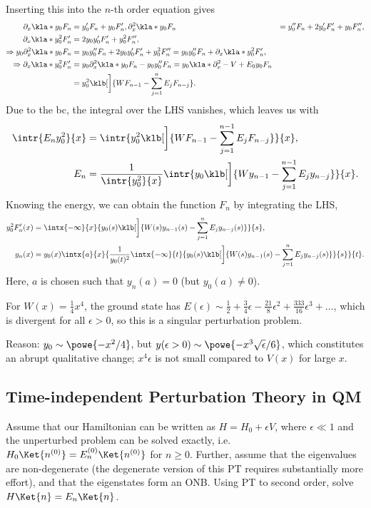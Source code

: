 \documentclass[english, parskip=full]{scrbook}
\newcommand{\note}[1]{\begin{tcolorbox}[colback=colorbackgroundnote,colframe=colornote, breakable,enhanced]#1\end{tcolorbox}}
\newcommand{\example}[3]{\begin{tcolorbox}[colback=colorbackgroundexample,colframe=colorexample, breakable,enhanced,title={\textbf{#1}: #2.}]#3\end{tcolorbox}}
\begin{document}
\example{Method of Reduction}{$y_n(x) = y_0(x)F_n(x)$ with $F_0(x)=1$}{Inserting this into the $n$-th order equation gives
\begin{align}
\partial_x \kla*{y_0F_n} &= y_0'F_n + y_0F_n',
\partial_x^2 \kla*{y_0F_n} &= y_0'' F_n + 2y_0'F_n' + y_0F_n'',\\
\partial_x \kla*{y_0^2 F_n'} &= 2y_0y_0'F_n' + y_0^2 F_n'',\\
\Rightarrow y_0 \partial_x^2 \kla*{y_0 F_n} &= y_0y_0'' F_n + 2y_0y_0'F_n' + y_0^2F_n'' = y_0y_0''F_n + \partial_x\kla*{y_0^2 F_n'},\\
\Rightarrow \partial_x \kla*{y_0^2F_n'} &= y_0\partial_x^2 \kla*{y_0F_n} - y_0y_0''F_n = y_0\kla*{\partial_x^2 - V+E_0} y_0F_n\\
&= y_0^2 \klb[\bigg]{WF_{n-1} - \sum_{j=1}^n E_jF_{n-j}}.
\end{align}
Due to the \gls{bc}, the integral over the LHS vanishes, which leaves us with
\begin{align}
\intr{E_n y_0^2}{x} &= \intr{y_0^2 \klb[\bigg]{WF_{n-1} - \sum_{j=1}^{n-1} E_j F_{n-j}}}{x},\\
E_n &= \frac{1}{\intr{y_0^2}{x}} \intr{y_0 \klb[\bigg]{Wy_{n-1} - \sum_{j=1}^{n-1} E_j y_{n-j}}}{x}.
\end{align}
Knowing the energy, we can obtain the function $F_n$ by integrating the LHS,
\begin{align}
y_0^2 F_n'(x) &= \intx{-\infty}{x}{y_0(s) \klb[\bigg]{W(s)y_{n-1}(s) - \sum_{j=1}^{n} E_j y_{n-j}(s)}}{s},\\
y_n(x) &= y_0(x) \intx{a}{x}{\frac{1}{y_0(t)^2} \intx{-\infty}{t}{y_0(s) \klb[\bigg]{W(s)y_{n-1}(s) - \sum_{j=1}^{n} E_j y_{n-j}(s)}}{s}}{t}.
\end{align}
Here, $a$ is chosen such that $y_n(a)=0$ (but $y_0(a)\neq 0$).

For $W(x)=\frac{1}{4}x^4$, the ground state has $E(\epsilon) \sim \frac{1}{2} + \frac{3}{4}\epsilon - \frac{21}{8} \epsilon^2 + \frac{333}{16}\epsilon^3 + \dots$, which is divergent for all $\epsilon> 0$, so this is a singular perturbation problem.
\note{Reason: $y_0 \sim \powe{-x^2/4}$, but $y(\epsilon > 0) \sim \powe{-x^3 \sqrt{\epsilon} / 6}$, which constitutes an abrupt qualitative change; $x^4\epsilon$ is not small compared to $V(x)$ for large $x$.}
}
\subsection{Time-independent Perturbation Theory in QM}
Assume that our Hamiltonian can be written as $H=H_0+\epsilon V$, where $\epsilon\ll 1$ and the unperturbed problem can be solved exactly, i.e. $H_0\Ket{n^{(0)}} = E_n^{(0)} \Ket{n^{(0)}}$ for $n\ge 0$.
Further, assume that the eigenvalues are non-degenerate (the degenerate version of this PT requires substantially more effort), and that the eigenstates form an ONB.
Using PT to second order, solve $H\Ket{n} = E_n\Ket{n}$.
\end{document}
